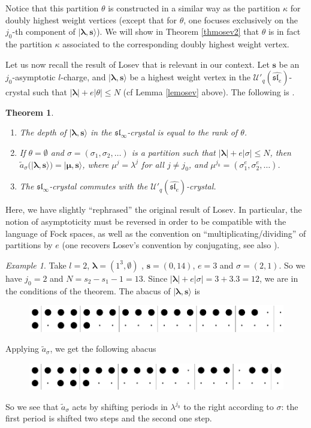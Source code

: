 \documentclass[twoside,12pt]{amsart}
\theoremstyle{plain}
\newcommand{\fl}{\mathfrak{l}}
\newcommand{\fs}{\mathfrak{s}}
\newcommand{\bs}{\mathbf{s}}
\newcommand{\si}{\sigma}
\newcommand{\la}{\lambda}
\newcommand{\ka}{\kappa}
\newcommand{\bla}{\boldsymbol{\la}}
\newcommand{\bmu}{\boldsymbol{\mu}}
\newcommand{\ta}{\tilde{a}}
\newcommand{\Ue}{\mathcal{U}'_q (\widehat{\mathfrak{sl}_e})}
\newtheorem{thm}[num]{Theorem}
\theoremstyle{remark}
\newtheorem{exa}[num]{Example}
\begin{document}
Notice that this partition $\theta$ is constructed in a similar way as the partition $\ka$ for doubly highest weight vertices
(except that for $\theta$, one focuses exclusively on the $j_0$-th component of $|\bla,\bs\rangle$).
We will show in Theorem \ref{thmosev2} that $\theta$ is in fact the partition $\ka$ associated to the corresponding 
doubly highest weight vertex.


Let us now recall the result of Losev that is relevant in our context.
Let $\bs$ be an $j_0$-asymptotic $l$-charge, and
$|\bla,\bs\rangle$ be a highest weight vertex in the $\Ue$-crystal such that $|\bla|+e|\theta|\leq N$
(cf Lemma \ref{lemosev} above).
The following is \cite[Section 5.1.2 and Proposition 5.3]{Losev2015}.

\begin{thm}\label{thmosev}\
\begin{enumerate}
 \item The depth of $|\bla,\bs\rangle$ in the $\fs\fl_\infty$-crystal is equal to the rank of $\theta$.
\item If $\theta=\emptyset$ and $\si=(\si_1,\si_2,\dots)$ is a partition such that $|\bla|+e|\si|\leq N$, then
$\ta_\si (|\bla,\bs\rangle)=|\bmu,\bs\rangle$, where
$\mu^j=\la^j$ for all $j\neq j_0$, and $\mu^{j_0}=(\si_1^e,\si_2^e,\dots)$.
\item The $\fs\fl_\infty$-crystal commutes with the $\Ue$-crystal.
\end{enumerate}
\end{thm}

Here, we have slightly ``rephrased'' the original result of Losev.
In particular, the notion of asymptoticity must be reversed in order to be compatible with the language of Fock spaces,
as well as the convention on ``multiplicating/dividing'' of partitions by $e$ 
(one recovers Losev's convention by conjugating, see also \cite[Section 5.5]{Losev2015}).


\begin{exa}
Take $l=2$, $\bla = (1^3,\emptyset)$ , $\bs= (0,14)$, $e=3$ and $\si=(2,1)$.
So we have $j_0=2$ and $N=s_2-s_1-1=13$. Since $|\bla|+e|\si|=3+3.3=12$,
we are in the conditions of the theorem.
The abacus of $|\bla,\bs\rangle$ is
\begin{figure}[H] 
\includegraphics{images/abaque22.eps}
\label{ab22}
\end{figure}
Applying $\ta_\si$, we get the following abacus
\begin{figure}[H] 
\includegraphics{images/abaque23.eps}
\label{ab23}
\end{figure}
So we see that $\ta_\si$ acts by shifting periods in $\la^{j_0}$ to the right according to $\si$:
the first period is shifted two steps and the second one step.
\end{exa}
\end{document}

